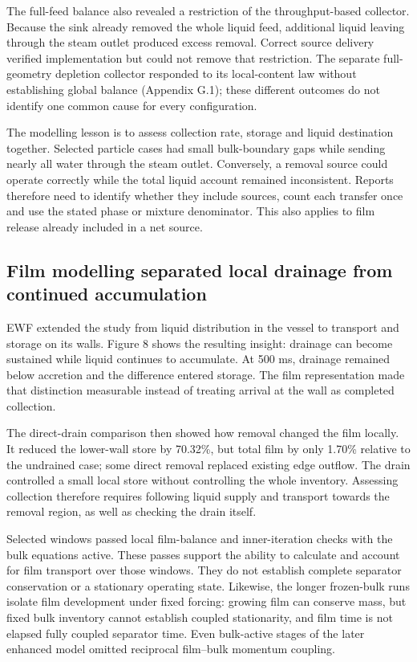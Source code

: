 The full-feed balance also revealed a restriction of the throughput-based collector. Because the sink already removed the whole liquid feed, additional liquid leaving through the steam outlet produced excess removal. Correct source delivery verified implementation but could not remove that restriction. The separate full-geometry depletion collector responded to its local-content law without establishing global balance (Appendix G.1); these different outcomes do not identify one common cause for every configuration.

The modelling lesson is to assess collection rate, storage and liquid destination together. Selected particle cases had small bulk-boundary gaps while sending nearly all water through the steam outlet. Conversely, a removal source could operate correctly while the total liquid account remained inconsistent. Reports therefore need to identify whether they include sources, count each transfer once and use the stated phase or mixture denominator. This also applies to film release already included in a net source.

\subsection{Film modelling separated local drainage from continued accumulation}

EWF extended the study from liquid distribution in the vessel to transport and storage on its walls. Figure 8 shows the resulting insight: drainage can become sustained while liquid continues to accumulate. At 500 ms, drainage remained below accretion and the difference entered storage. The film representation made that distinction measurable instead of treating arrival at the wall as completed collection.

The direct-drain comparison then showed how removal changed the film locally. It reduced the lower-wall store by 70.32\%, but total film by only 1.70\% relative to the undrained case; some direct removal replaced existing edge outflow. The drain controlled a small local store without controlling the whole inventory. Assessing collection therefore requires following liquid supply and transport towards the removal region, as well as checking the drain itself.

Selected windows passed local film-balance and inner-iteration checks with the bulk equations active. These passes support the ability to calculate and account for film transport over those windows. They do not establish complete separator conservation or a stationary operating state. Likewise, the longer frozen-bulk runs isolate film development under fixed forcing: growing film can conserve mass, but fixed bulk inventory cannot establish coupled stationarity, and film time is not elapsed fully coupled separator time. Even bulk-active stages of the later enhanced model omitted reciprocal film--bulk momentum coupling.

